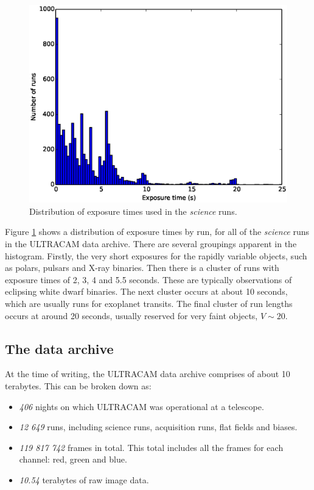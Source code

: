 \begin{figure}[!h]
  \centering
  \includegraphics[width=120mm]{images/cadences_hist0-25.eps}
  \caption{Distribution of exposure times used in the \emph{science} runs.}
  \label{fig:cadences}
\end{figure}

Figure \ref{fig:cadences} shows a distribution of exposure times by run, for all of the \emph{science} runs in the ULTRACAM data archive. There are several groupings apparent in the histogram. Firstly, the very short exposures for the rapidly variable objects, such as polars, pulsars and X-ray binaries. Then there is a cluster of runs with exposure times of 2, 3, 4 and 5.5 seconds. These are typically observations of eclipsing white dwarf binaries. The next cluster occurs at about 10 seconds, which are usually runs for exoplanet transits. The final cluster of run lengths occurs at around 20 seconds, usually reserved for very faint objects, $V\sim 20$.

\subsection{The data archive}
At the time of writing, the ULTRACAM data archive comprises of about 10 terabytes. This can be broken down as:
\begin{itemize}
	\item \emph{406} nights on which ULTRACAM was operational at a telescope.
	\item \emph{12 649} runs, including science runs, acquisition runs, flat fields and biases. 
	\item \emph{119 817 742} frames in total. This total includes all the frames for each channel: red, green and blue.
	\item \emph{10.54} terabytes of raw image data.
\end{itemize} 


